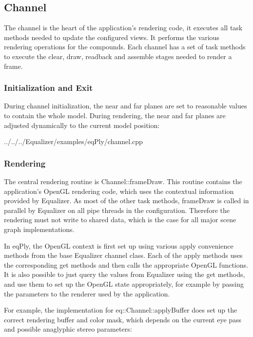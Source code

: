 \documentclass[10pt,a4]{scrartcl}
\begin{document}
\subsection{Channel}

The channel is the heart of the application's rendering code, it executes all
task methods needed to update the configured views. It performs the various
rendering operations for the compounds. Each channel has a set of task methods
to execute the clear, draw, readback and assemble stages needed to render a
frame.

\subsubsection{Initialization and Exit}

During channel initialization, the near and far planes are set to
reasonable values to contain the whole model. During rendering, the near
and far planes are adjusted dynamically to the current model position:

{\footnotesize
  {../../../Equalizer/examples/eqPly/channel.cpp}}

\subsubsection{Rendering}

The central rendering routine is \textsf{Channel::frameDraw}. This routine
contains the application's OpenGL rendering code, which uses the contextual
information provided by Equalizer. As most of the other task methods,
\textsf{frameDraw} is called in parallel by Equalizer on all pipe threads in the
configuration. Therefore the rendering must not write to shared data, which is
the case for all major scene graph implementations.

In \textsf{eqPly}, the OpenGL context is first set up using various
\textsf{apply} convenience methods from the base Equalizer channel class. Each
of the \textsf{apply} methods uses the corresponding \textsf{get} methods and
then calls the appropriate OpenGL functions. It is also possible to just query
the values from Equalizer using the \textsf{get} methods, and use them to set up
the OpenGL state appropriately, for example by passing the parameters to the
renderer used by the application.

For example, the implementation for \textsf{eq::Channel::applyBuffer}
does set up the correct rendering buffer and color mask, which depends
on the current eye pass and possible anaglyphic stereo parameters:
\end{document}

